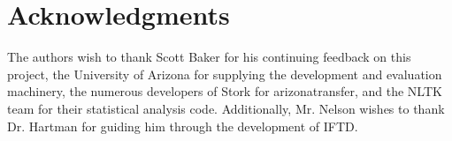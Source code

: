 \section{Acknowledgments}

The authors wish to thank Scott Baker for his continuing feedback on this project, the University of Arizona for supplying the development and evaluation machinery, the numerous developers of Stork for arizonatransfer, and the NLTK team for their statistical analysis code.  Additionally, Mr. Nelson wishes to thank Dr. Hartman for guiding him through the development of IFTD.
